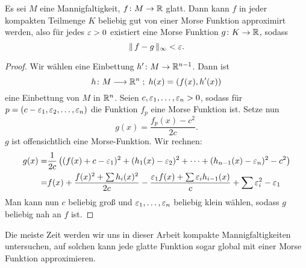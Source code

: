 \begin{theorem}
    \label{satz: morse-approximation}
    Es sei $M$ eine Mannigfaltigkeit, $f \colon M \to { \mathbb R }$ glatt. Dann kann $f$ in jeder kompakten
    Teilmenge $K$ beliebig gut von einer Morse Funktion approximirt werden, also für jedes 
    $\varepsilon > 0$ existiert eine Morse Funktion $g \colon K \to { \mathbb R }$, sodass 
    \[ \| \, f - g \, \|_{\infty} < \varepsilon . \]
\end{theorem}

\begin{proof}
    Wir wählen eine Einbettung $h' \colon M \to { \mathbb R }^{n - 1}$. Dann ist 
    \[ h \colon M \longrightarrow { \mathbb R }^n \; ; \; h(x) = (f(x), h'(x)) \]
    eine Einbettung von $M$ in ${ \mathbb R }^n$. Seien $c, \varepsilon_1, \dots, \varepsilon_n > 0$, sodass für \\
    $p = (c - \varepsilon_1, \varepsilon_2, \dots, \varepsilon_n)$ die Funktion $f_p$ eine Morse Funktion ist.
    Setze nun 
    \[ g(x) = \frac{f_p(x) - c^2}{2c} . \]
    $g$ ist offensichtlich eine Morse-Funktion. Wir rechnen:
    \begin{align*}
        g(x) = & \frac{1}{2c} \left( (f(x) + c - \varepsilon_1)^2 + (h_1(x) - \varepsilon_2)^2 
            + \dots + (h_{n-1}(x) - \varepsilon_n)^2 - c^2 \right) \\
        = & f(x) + \frac{f(x)^2 + \sum h_i(x)^2}{2c} - \frac{\varepsilon_1 f(x) 
            + \sum \varepsilon_i h_{i - 1}(x)}{c} + \sum \varepsilon_i^2 - \varepsilon_1
    \end{align*}
    Man kann nun $c$ beliebig groß und $\varepsilon_1, \dots, \varepsilon_n$ beliebig klein wählen,
    sodass $g$ beliebig nah an $f$ ist.
\end{proof}

\begin{remark}
    Die meiste Zeit werden wir uns in dieser Arbeit kompakte Mannigfaltigkeiten untersuchen,
    auf solchen kann jede glatte Funktion sogar global mit einer Morse Funktion approximieren.
\end{remark}
